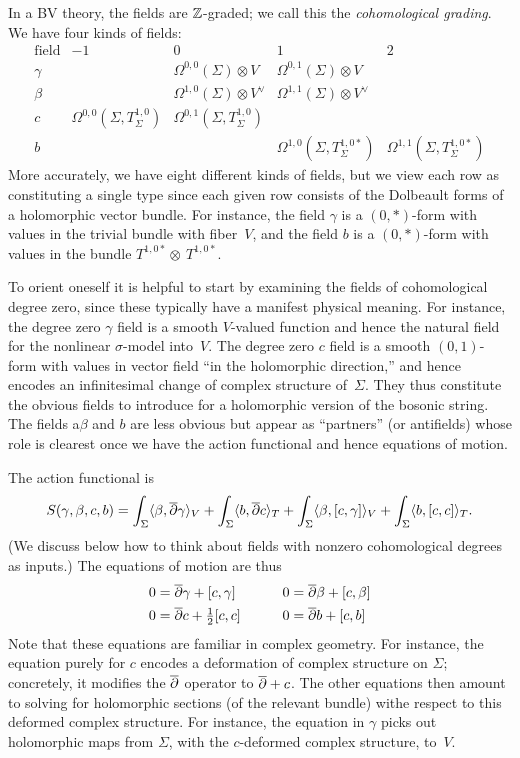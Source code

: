 In a BV theory, the fields are $\mathbb Z$-graded;
we call this the {\em cohomological grading}.
We have four kinds of fields:
\[
\begin{array}{ccccc}
\text{field} & -1 & 0 & 1 & 2\\
\hline
\gamma & & \Omega^{0,0}(\Sigma) \otimes V & \Omega^{0,1}(\Sigma) \otimes V & \\
\beta & & \Omega^{1,0}(\Sigma) \otimes V^\vee & \Omega^{1,1}(\Sigma) \otimes V^\vee & \\
c & \Omega^{0,0}(\Sigma, T^{1,0}_\Sigma) & \Omega^{0,1}(\Sigma, T^{1,0}_\Sigma) & \\
b & & & \Omega^{1,0}(\Sigma, T^{1,0 *}_\Sigma) & \Omega^{1,1}(\Sigma, T^{1,0 *}_\Sigma)
\end{array}
\]
More accurately, we have eight different kinds of fields, 
but we view each row as constituting a single type 
since each given row consists of the Dolbeault forms of a holomorphic vector bundle.
For instance, the field $\gamma$ is a $(0,*)$-form with values in the trivial bundle with fiber~$V$,
and the field $b$ is a $(0,*)$-form with values in the bundle $T^{1,0 *} \otimes~T^{1,0 *}$.

To orient oneself it is helpful to start by examining the fields of cohomological degree zero,
since these typically have a manifest physical meaning.
For instance, the degree zero $\gamma$ field is a smooth $V$-valued function
and hence the natural field for the nonlinear $\sigma$-model into~$V$.
The degree zero $c$ field is a smooth $(0,1)$-form with values in vector field ``in the holomorphic direction,''
and hence encodes an infinitesimal change of complex structure of~$\Sigma$.
They thus constitute the obvious fields to introduce for a holomorphic version of the bosonic string.
The fields a$\beta$ and $b$ are less obvious but appear as ``partners'' (or antifields)
whose role is clearest once we have the action functional and hence equations of motion.

The action functional is
\begin{equation}
S(\gamma,\beta,c,b) = 
\int_\Sigma \langle \beta, \overline{\partial} \gamma \rangle_V 
+ \int_\Sigma \langle b, \overline{\partial} c \rangle_T 
+ \int_\Sigma \langle \beta, [c,\gamma] \rangle_V 
+ \int_\Sigma \langle b, [c,c] \rangle_T.
\end{equation}
(We discuss below how to think about fields with nonzero cohomological degrees as inputs.)
The equations of motion are thus
\begin{alignat*}{2}
0 &= \overline{\partial} \gamma + [c,\gamma] & \quad\quad  0 &= \overline{\partial} \beta + [c,\beta] \\
0  &= \overline{\partial} c + \tfrac{1}{2} [c,c] & \quad\quad  0 &= \overline{\partial} b + [c,b] 
\end{alignat*}
Note that these equations are familiar in complex geometry.
For instance, the equation purely for $c$ encodes a deformation of complex structure on $\Sigma$; concretely, it modifies the $\overline{\partial}$ operator to $\overline{\partial} + c$.
The other equations then amount to solving for holomorphic sections (of the relevant bundle) withe respect to this deformed complex structure.
For instance, the equation in $\gamma$ picks out holomorphic maps from $\Sigma$,
with the $c$-deformed complex structure, to~$V$.

